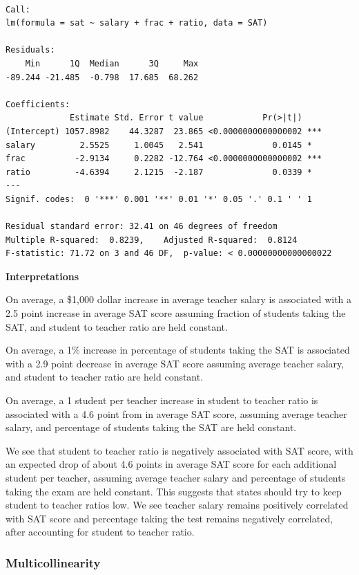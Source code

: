 \documentclass[
  letterpaper,
  DIV=11,
  numbers=noendperiod]{scrreprt}
\begin{document}
\begin{verbatim}

Call:
lm(formula = sat ~ salary + frac + ratio, data = SAT)

Residuals:
    Min      1Q  Median      3Q     Max 
-89.244 -21.485  -0.798  17.685  68.262 

Coefficients:
             Estimate Std. Error t value            Pr(>|t|)    
(Intercept) 1057.8982    44.3287  23.865 <0.0000000000000002 ***
salary         2.5525     1.0045   2.541              0.0145 *  
frac          -2.9134     0.2282 -12.764 <0.0000000000000002 ***
ratio         -4.6394     2.1215  -2.187              0.0339 *  
---
Signif. codes:  0 '***' 0.001 '**' 0.01 '*' 0.05 '.' 0.1 ' ' 1

Residual standard error: 32.41 on 46 degrees of freedom
Multiple R-squared:  0.8239,    Adjusted R-squared:  0.8124 
F-statistic: 71.72 on 3 and 46 DF,  p-value: < 0.00000000000000022
\end{verbatim}

\textbf{Interpretations}

On average, a \$1,000 dollar increase in average teacher salary is
associated with a 2.5 point increase in average SAT score assuming
fraction of students taking the SAT, and student to teacher ratio are
held constant.

On average, a 1\% increase in percentage of students taking the SAT is
associated with a 2.9 point decrease in average SAT score assuming
average teacher salary, and student to teacher ratio are held constant.

On average, a 1 student per teacher increase in student to teacher ratio
is associated with a 4.6 point from in average SAT score, assuming
average teacher salary, and percentage of students taking the SAT are
held constant.

We see that student to teacher ratio is negatively associated with SAT
score, with an expected drop of about 4.6 points in average SAT score
for each additional student per teacher, assuming average teacher salary
and percentage of students taking the exam are held constant. This
suggests that states should try to keep student to teacher ratios low.
We see teacher salary remains positively correlated with SAT score and
percentage taking the test remains negatively correlated, after
accounting for student to teacher ratio.

\subsubsection{Multicollinearity}\label{multicollinearity}
\end{document}
